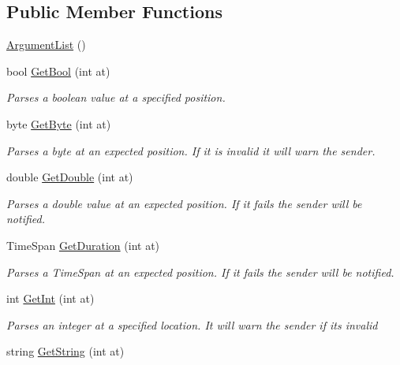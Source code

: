 \subsection*{Public Member Functions}
\begin{DoxyCompactItemize}
\item 
\hyperlink{classOTA_1_1Command_1_1ArgumentList_ab6e8f177f57931b8a4dc90e1bbf9bcf9}{Argument\+List} ()
\item 
bool \hyperlink{classOTA_1_1Command_1_1ArgumentList_a6bc7818c3a45a36d9f2cf6e12ce8a2db}{Get\+Bool} (int at)
\begin{DoxyCompactList}\small\item\em Parses a boolean value at a specified position. \end{DoxyCompactList}\item 
byte \hyperlink{classOTA_1_1Command_1_1ArgumentList_a3d9bef96ff373ddbc729f270665c2983}{Get\+Byte} (int at)
\begin{DoxyCompactList}\small\item\em Parses a byte at an expected position. If it is invalid it will warn the sender. \end{DoxyCompactList}\item 
double \hyperlink{classOTA_1_1Command_1_1ArgumentList_a32fdf502aede47d741576ed780470370}{Get\+Double} (int at)
\begin{DoxyCompactList}\small\item\em Parses a double value at an expected position. If it fails the sender will be notified. \end{DoxyCompactList}\item 
Time\+Span \hyperlink{classOTA_1_1Command_1_1ArgumentList_a1c04674d910823a9bc612d99914e507f}{Get\+Duration} (int at)
\begin{DoxyCompactList}\small\item\em Parses a Time\+Span at an expected position. If it fails the sender will be notified. \end{DoxyCompactList}\item 
int \hyperlink{classOTA_1_1Command_1_1ArgumentList_abe6125ea3957d831e8b39a6b6cf1221f}{Get\+Int} (int at)
\begin{DoxyCompactList}\small\item\em Parses an integer at a specified location. It will warn the sender if it\textquotesingle{}s invalid \end{DoxyCompactList}\item 
string \hyperlink{classOTA_1_1Command_1_1ArgumentList_a06c76c0eb36f7630e1f064a79cc84e72}{Get\+String} (int at)

\end{DoxyCompactItemize}
